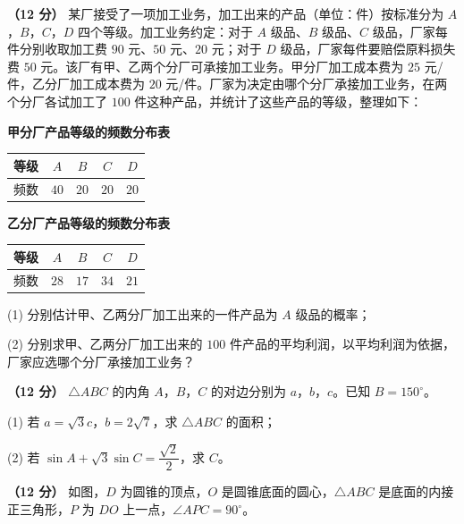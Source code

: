 
\textbf{（12 分）} 某厂接受了一项加工业务，加工出来的产品（单位：件）按标准分为 $A$，$B$，$C$，$D$ 四个等级。加工业务约定：对于 $A$ 级品、$B$ 级品、$C$ 级品，厂家每件分别收取加工费 $90$ 元、$50$ 元、$20$ 元；对于 $D$ 级品，厂家每件要赔偿原料损失费 $50$ 元。该厂有甲、乙两个分厂可承接加工业务。甲分厂加工成本费为 $25$ 元/件，乙分厂加工成本费为 $20$ 元/件。厂家为决定由哪个分厂承接加工业务，在两个分厂各试加工了 $100$ 件这种产品，并统计了这些产品的等级，整理如下：

\textbf{甲分厂产品等级的频数分布表}

\begin{center}
\begin{tabular}{ccccc}
\toprule
等级 & $A$ & $B$ & $C$ & $D$ \\
\midrule
频数 & $40$ & $20$ & $20$ & $20$ \\
\bottomrule
\end{tabular}
\end{center}

\textbf{乙分厂产品等级的频数分布表}

\begin{center}
\begin{tabular}{ccccc}
\toprule
等级 & $A$ & $B$ & $C$ & $D$ \\
\midrule
频数 & $28$ & $17$ & $34$ & $21$ \\
\bottomrule
\end{tabular}
\end{center}

  (1) 分别估计甲、乙两分厂加工出来的一件产品为 $A$ 级品的概率；

  (2) 分别求甲、乙两分厂加工出来的 $100$ 件产品的平均利润，以平均利润为依据，厂家应选哪个分厂承接加工业务？

\textbf{（12 分）} $\triangle ABC$ 的内角 $A$，$B$，$C$ 的对边分别为 $a$，$b$，$c$。已知 $B=150^\circ$。

  (1) 若 $a=\sqrt3c$，$b=2\sqrt7$，求 $\triangle ABC$ 的面积；

  (2) 若 $\sin A+\sqrt3\sin C=\dfrac{\sqrt2}2$，求 $C$。

\textbf{（12 分）} 如图，$D$ 为圆锥的顶点，$O$ 是圆锥底面的圆心，$\triangle ABC$ 是底面的内接正三角形，$P$ 为 $DO$ 上一点，$\angle APC=90^\circ$。

\begin{center}\end{center}

